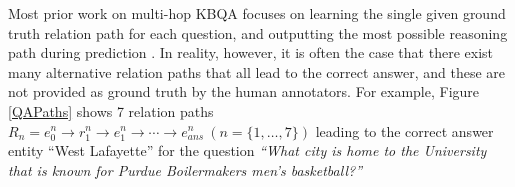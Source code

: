 Most prior work on multi-hop KBQA focuses on learning the single given ground truth relation path for each question, and outputting  the most possible reasoning path during prediction . In reality, however, it is often the case that there exist many alternative relation paths that all lead to the correct answer, and these are not provided as ground truth by the human annotators. %
For example, Figure \ref{QAPaths} shows 7 relation paths $R_n={e^n_0\rightarrow r^n_1 \rightarrow e^n_1 \rightarrow \cdots \rightarrow e^n_{ans}}\ (n=\lbrace 1, \dots, 7 \rbrace)$ leading to the correct answer entity ``West Lafayette'' for the question \textit{``What city is home to the University that is known for Purdue Boilermakers men's basketball?''} %
